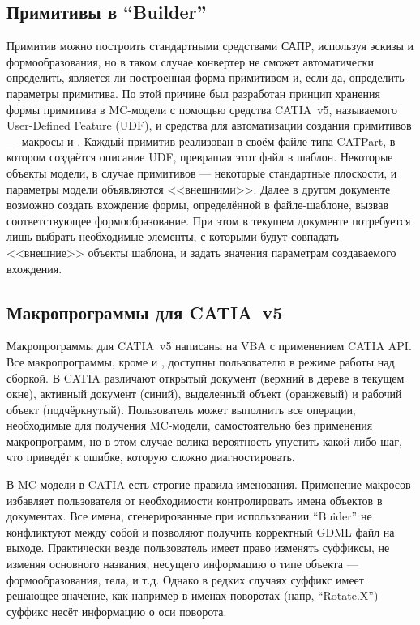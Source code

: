 \subsection{Примитивы в ``Builder''}\label{sec:Primitives}

Примитив можно построить стандартными средствами САПР, используя эскизы и формообразования, но в таком случае конвертер не сможет  автоматически определить, является ли построенная форма примитивом и, если да, определить параметры примитива. По этой причине был разработан принцип хранения формы примитива в MC-модели с помощью средства CATIA~v5, называемого User-Defined Feature (UDF), и средства для автоматизации создания примитивов --- макросы  и . Каждый примитив реализован в своём файле типа CATPart, в котором создаётся описание UDF, превращая этот файл в шаблон. Некоторые объекты модели, в случае примитивов --- некоторые стандартные плоскости, и параметры модели объявляются <<внешними>>. Далее в другом документе возможно создать вхождение формы, определённой в файле-шаблоне, вызвав соответствующее формообразование. При этом в текущем документе потребуется лишь выбрать необходимые элементы, с которыми будут совпадать <<внешние>> объекты шаблона, и задать значения параметрам создаваемого вхождения.

\subsection{Макропрограммы для CATIA~v5}\label{sec:Macros}

Макропрограммы для CATIA~v5 написаны на VBA с применением CATIA API. Все макропрограммы, кроме  и , доступны пользователю в режиме работы над сборкой. В CATIA различают открытый документ (верхний в дереве в текущем окне), активный документ (синий), выделенный объект (оранжевый) и рабочий объект (подчёркнутый). Пользователь может выполнить все операции, необходимые для получения MC-модели, самостоятельно без применения макропрограмм, но в этом случае велика вероятность упустить какой-либо шаг, что приведёт к ошибке, которую сложно диагностировать.

В MC-модели в CATIA есть строгие правила именования. Применение макросов избавляет пользователя от необходимости контролировать имена объектов в документах. Все имена, сгенерированные при использовании ``Buider'' не конфликтуют между собой и позволяют получить корректный GDML файл на выходе. Практически везде пользователь имеет право изменять суффиксы, не изменяя основного названия, несущего информацию о типе объекта --- формообразования, тела, и т.д. Однако в редких случаях суффикс имеет решающее значение, как например в именах поворотах (напр, ``Rotate.X'') суффикс несёт информацию о оси поворота.

